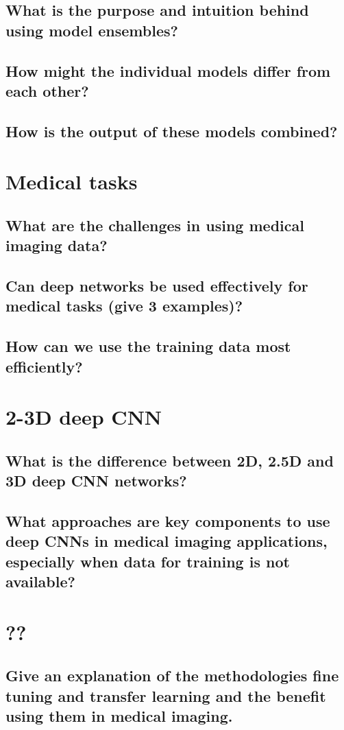 \subsection{What is the purpose and intuition behind using model ensembles?}
\subsection{How might the individual models differ from each other?}
\subsection{How is the output of these models combined?}

\section{Medical tasks}
\subsection{What are the challenges in using medical imaging data?}
\subsection{Can deep networks be used effectively for medical tasks (give 3 examples)?}
\subsection{How can we use the training data most efficiently?}

\section{2-3D deep CNN}
\subsection{What is the difference between 2D, 2.5D and 3D deep CNN networks?}
\subsection{What approaches are key components to use deep CNNs in medical imaging applications, especially when data for training is not available?}

\section{??}
\subsection{Give an explanation of the methodologies fine tuning and transfer learning and the benefit using them in medical imaging. }
